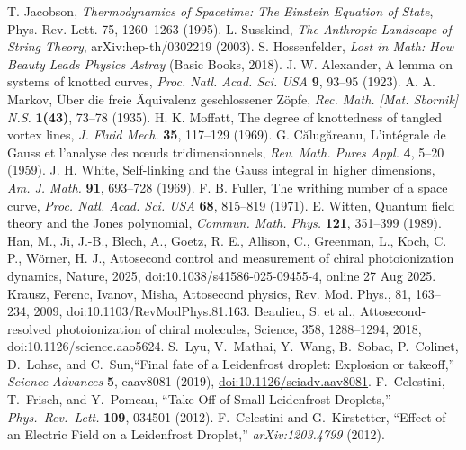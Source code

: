\documentclass[10pt,reprint,aps,onecolumn,nofootinbib]{revtex4-2}
\begin{document}
\begin{thebibliography}{99}
     T. Jacobson, \emph{Thermodynamics of Spacetime: The Einstein Equation of State}, Phys. Rev. Lett. 75, 1260–1263 (1995).
     L. Susskind, \emph{The Anthropic Landscape of String Theory}, arXiv:hep-th/0302219 (2003).
     S. Hossenfelder, \emph{Lost in Math: How Beauty Leads Physics Astray} (Basic Books, 2018).
     J. W. Alexander, A lemma on systems of knotted curves, \emph{Proc. Natl. Acad. Sci. USA} \textbf{9}, 93–95 (1923).
     A. A. Markov, Über die freie Äquivalenz geschlossener Zöpfe, \emph{Rec. Math. [Mat. Sbornik] N.S.} \textbf{1(43)}, 73–78 (1935).
     H. K. Moffatt, The degree of knottedness of tangled vortex lines, \emph{J. Fluid Mech.} \textbf{35}, 117–129 (1969).
     G. Călugăreanu, L’intégrale de Gauss et l’analyse des nœuds tridimensionnels, \emph{Rev. Math. Pures Appl.} \textbf{4}, 5–20 (1959).
     J. H. White, Self-linking and the Gauss integral in higher dimensions, \emph{Am. J. Math.} \textbf{91}, 693–728 (1969).
     F. B. Fuller, The writhing number of a space curve, \emph{Proc. Natl. Acad. Sci. USA} \textbf{68}, 815–819 (1971).
     E. Witten, Quantum field theory and the Jones polynomial, \emph{Commun. Math. Phys.} \textbf{121}, 351–399 (1989).
     Han, M., Ji, J.-B., Blech, A., Goetz, R. E., Allison, C., Greenman, L., Koch, C. P., W\"orner, H. J., Attosecond control and measurement of chiral photoionization dynamics, Nature, 2025, doi:10.1038/s41586-025-09455-4, online 27 Aug 2025.
     Krausz, Ferenc, Ivanov, Misha, Attosecond physics, Rev. Mod. Phys., 81, 163--234, 2009, doi:10.1103/RevModPhys.81.163.
     Beaulieu, S. et al., Attosecond-resolved photoionization of chiral molecules, Science, 358, 1288--1294, 2018, doi:10.1126/science.aao5624.
     S.~Lyu, V.~Mathai, Y.~Wang, B.~Sobac, P.~Colinet, D.~Lohse, and C.~Sun,``Final fate of a Leidenfrost droplet: Explosion or takeoff,'' \emph{Science Advances} \textbf{5}, eaav8081 (2019), \href{https://doi.org/10.1126/sciadv.aav8081}{doi:10.1126/sciadv.aav8081}.
     F.~Celestini, T.~Frisch, and Y.~Pomeau, ``Take Off of Small Leidenfrost Droplets,'' \emph{Phys.\ Rev.\ Lett.} \textbf{109}, 034501 (2012).
     F.~Celestini and G.~Kirstetter, ``Effect of an Electric Field on a Leidenfrost Droplet,'' \emph{arXiv:1203.4799} (2012).

    \end{thebibliography}
\end{document}
